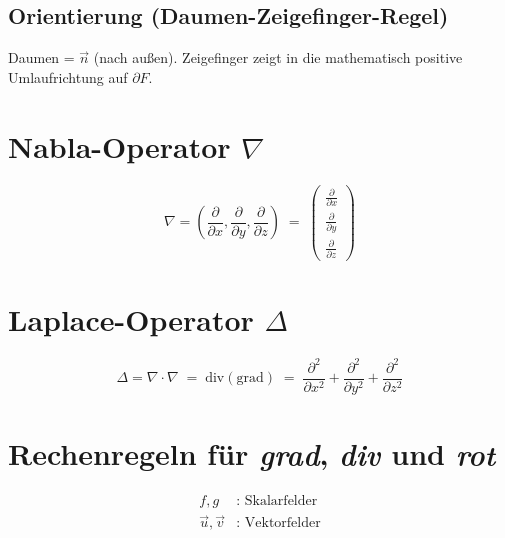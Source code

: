 \documentclass[a4paper,11pt,oneside,open=any,parskip=half, DIV=15]{scrreprt}
\begin{document}
   \subsection*{Orientierung (Daumen-Zeigefinger-Regel)}

      Daumen = \(\vec{n}\) (nach außen). Zeigefinger zeigt in die mathematisch positive Umlaufrichtung auf \(\partial F\).

\section[Nabla-Operator nabla ]{Nabla-Operator \texorpdfstring{$\nabla$}{nabla}}

   \begin{importantbox}
      \[
         \nabla = (\frac{\partial}{\partial x},
            \frac{\partial}{\partial y},
            \frac{\partial}{\partial z}) \; = \; \begin{pmatrix}
            \frac{\partial}{\partial x}\\[6pt]
            \frac{\partial}{\partial y}\\[6pt]
            \frac{\partial}{\partial z}
         \end{pmatrix}
      \]
   \end{importantbox}

\section[Laplace-Operator Delta]{Laplace-Operator \texorpdfstring{$\Delta$}{Delta}}

   \begin{importantbox}
      \[
         \Delta = \nabla\cdot\nabla \; = \; \text{div}(\text{grad} ) \; = \; \frac{\partial^2}{\partial x^2} + \frac{\partial^2}{\partial y^2} + \frac{\partial^2}{\partial z^2}
      \]
   \end{importantbox}

\section{Rechenregeln für \textit{grad}, \textit{div} und \textit{rot}}

   \[
      \begin{aligned}
         f,g &\text{: Skalarfelder}\\
         \vec u,\vec v &\text{: Vektorfelder}
      \end{aligned}
   \]
\end{document}

